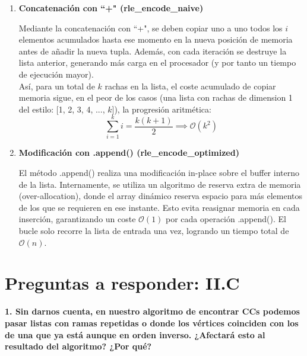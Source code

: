 \documentclass{article}
\begin{document}
\begin{enumerate}

    \vspace{0.5cm}
    \item \textbf{Concatenación con ``+" (rle\_encode\_naive)}

    Mediante la concatenación con ``+", se deben copiar uno a uno todos los $i$ elementos acumulados hasta ese momento en la nueva posición de memoria antes de añadir la nueva tupla. Además, con cada iteración se destruye la lista anterior, generando más carga en el procesador (y por tanto un tiempo de ejecución mayor).\\
    Así, para un total de $k$ rachas en la lista, el coste acumulado de copiar memoria sigue, en el peor de los casos (una lista con rachas de dimension 1 del estilo: [1, 2, 3, 4, ..., $k$]), la progresión aritmética:$$\sum_{i=1}^{k} i = \frac{k(k+1)}{2} \implies \mathcal{O}(k^2)$$

    \newpage %
    \item \textbf{Modificación con .append() (rle\_encode\_optimized)}

    El método .append() realiza una modificación in-place sobre el buffer interno de la lista. Internamente, se utiliza un algoritmo de reserva extra de memoria (over-allocation), donde el array dinámico reserva espacio para más elementos de los que se requieren en ese instante. Esto evita reasignar memoria en cada inserción, garantizando un coste $\mathcal{O}(1)$ por cada operación .append(). El bucle solo recorre la lista de entrada una vez, logrando un tiempo total de $\mathcal{O}(n)$.
    
\end{enumerate}

\vspace{0.5cm}

\section{Preguntas a responder: II.C}

    \item \textbf{1. Sin darnos cuenta, en nuestro algoritmo de encontrar CCs podemos pasar listas con ramas repetidas o donde los vértices coinciden con los de una que ya está aunque en orden inverso. ¿Afectará esto al resultado del algoritmo? ¿Por qué?}

    \vspace{0.3cm}
\end{document}

